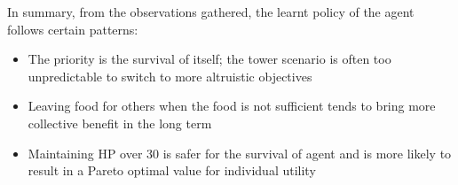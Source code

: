 In summary, from the observations gathered, the learnt policy of the agent follows certain patterns:
\begin{itemize}
	\item The priority is the survival of itself; the tower scenario is often too unpredictable to switch to more altruistic objectives
	\item Leaving food for others when the food is not sufficient tends to bring more collective benefit in the long term
	\item Maintaining HP over 30 is safer for the survival of agent and is more likely to result in a Pareto optimal value for individual utility
\end{itemize}


